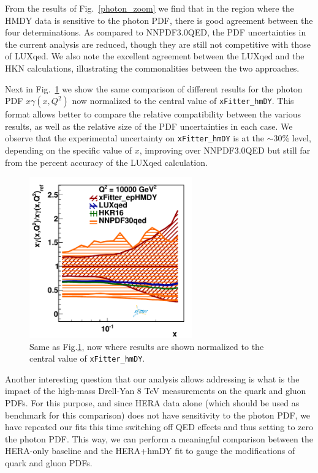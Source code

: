 From the results of Fig.~\ref{photon_zoom} we find that in the region where the HMDY data is
sensitive to the photon PDF, there is good agreement between the four determinations.
%
As compared to NNPDF3.0QED, the PDF uncertainties in the current analysis are reduced, though
they are still not competitive with those of LUXqed.
%
We also note the excellent agreement between the LUXqed and the HKN calculations,
illustrating the commonalities between the two approaches.

Next in Fig.~\ref{photon_zoom_ratio} we show the same comparison of different
results for the photon PDF $x\gamma(x,Q^2)$ now normalized to the central value of {\tt xFitter\_hmDY}.
%
This format allows better to compare the relative compatibility between the various results,
as well as the relative size of the PDF uncertainties in each case.
%
We observe that the experimental uncertainty on {\tt xFitter\_hmDY} is at the $\sim 30\%$ level,
depending on the specific value of $x$, improving over NNPDF3.0QED but still far from the
percent accuracy of the LUXqed calculation.

\begin{figure}[h]
\includegraphics[width=7cm]{figs/photon_comp_10000_ratio.pdf} 
\caption{Same as Fig.\ref{photon_zoom_ratio}, now where results
  are shown normalized to the central value of {\tt xFitter\_hmDY}.
  }
\label{photon_zoom_ratio}
\end{figure}

Another interesting question that our analysis allows addressing is what is
the impact of the high-mass Drell-Yan 8 TeV measurements on the quark and gluon
PDFs.
%
For this purpose, and since HERA data alone (which should be used as benchmark for
this comparison) does not have sensitivity to the photon PDF,
we have repeated our fits this time switching off QED effects and thus setting to zero
the photon PDF.
%
This way, we can perform a meaningful comparison between the HERA-only baseline and the
HERA+hmDY fit to gauge the modifications of quark and gluon PDFs.


